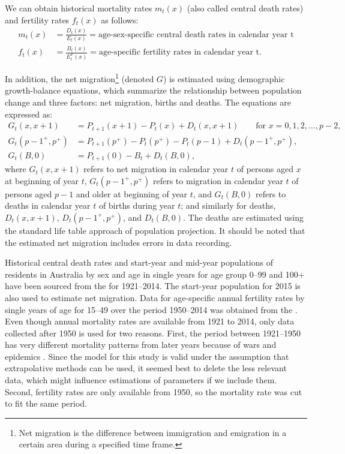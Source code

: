 \documentclass[11pt,a4paper,]{article}
\begin{document}
We can obtain historical mortality rates \(m_t(x)\) (also called central death rates) and fertility rates \(f_t(x)\) as follows:
\begin{align*}
  m_t(x) & = \frac{D_t(x)}{E_t(x)}=\text{age-sex-specific central death rates in calendar year t}\\
  f_t(x) & = \frac{B_t(x)}{E^F_t(x)}=\text{age-specific fertility rates in calendar year t}.
\end{align*}

In addition, the net migration\footnote{Net migration is the difference between immigration and emigration in a certain area during a specified time frame.} (denoted \(G\)) is estimated using demographic growth-balance equations, which summarize the relationship between population change and three factors: net migration, births and deaths. The equations are expressed as:
\begin{align*}
  G_t(x,x+1)     & =P_{t+1}(x+1)-P_t(x)+D_t(x,x+1)\qquad\text{for $x=0,1,2,\dots,p-2$},\\
  G_t(p-1^+,p^+) & =P_{t+1}(p^+)-P_t(p^+)-P_t(p-1)+D_t(p-1^+,p^+),\\
  G_t(B,0)       & =P_{t+1}(0)-B_t+D_t(B,0),
\end{align*}
where \(G_t(x,x+1)\) refers to net migration in calendar year \(t\) of persons aged \(x\) at beginning of year \(t\), \(G_t(p-1^+,p^+)\) refers to migration in calendar year \(t\) of persons aged \(p-1\) and older at beginning of year \(t\), and \(G_t(B,0)\) refers to deaths in calendar year \(t\) of births during year \(t\); and similarly for deaths, \(D_t(x,x+1)\), \(D_t(p-1^+,p^+)\), and \(D_t(B,0)\). The deaths are estimated using the standard life table approach of population projection. It should be noted that the estimated net migration includes errors in data recording.

Historical central death rates and start-year and mid-year populations of residents in Australia by sex and age in single years for age group 0--99 and 100+ have been sourced from the \textcite{HMD} for 1921--2014. The start-year population for 2015 is also used to estimate net migration. Data for age-specific annual fertility rates by single years of age for 15--49 over the period 1950--2014 was obtained from the \textcite{ABS12}. Even though annual mortality rates are available from 1921 to 2014, only data collected after 1950 is used for two reasons. First, the period between 1921--1950 has very different mortality patterns from later years because of wars and epidemics \autocite{HB08}. Since the model for this study is valid under the assumption that extrapolative methods can be used, it seemed best to delete the less relevant data, which might influence estimations of parameters if we include them. Second, fertility rates are only available from 1950, so the mortality rate was cut to fit the same period.
\end{document}
